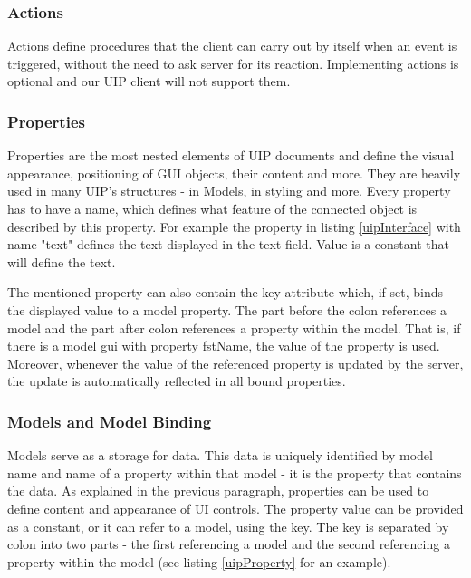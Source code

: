 \subsubsection{Actions}
Actions define procedures that the client can carry out by itself when an event is triggered, without the need to ask server for its reaction. Implementing actions is optional and our UIP client will not support them.

\subsubsection{Properties}
\label{subsec:props}
Properties are the most nested elements of UIP documents and define the visual appearance, positioning of GUI objects, their content and more. They are heavily used in many UIP's structures - in Models, in styling and more. Every property has to have a name, which defines what feature of the connected object is described by this property. For example the property in listing \ref{uipInterface} with name "text" defines the text displayed in the text field. Value is a constant that will define the text.

The mentioned property can also contain the key attribute which, if set, binds the displayed value to a model property. The part before the colon references a model and the part after colon references a property within the model. That is, if there is a model gui with property fstName, the value of the property is used. Moreover, whenever the value of the referenced property is updated by the server, the update is automatically reflected in all bound properties.



\subsubsection{Models and Model Binding}
Models serve as a storage for data. This data is uniquely identified by model name and name of a property within that model - it is the property that contains the data. As explained in the previous paragraph, properties can be used to define content and appearance of UI controls. The property value can be provided as a constant, or it can refer to a model, using the key. The key is separated by colon into two parts - the first referencing a model and the second referencing a property within the model (see listing \ref{uipProperty} for an example).

